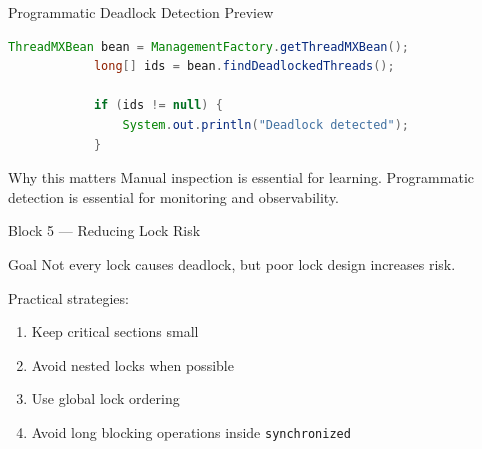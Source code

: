 \documentclass[aspectratio=169,11pt]{beamer}
\begin{document}
	\begin{frame}[fragile]{Programmatic Deadlock Detection Preview}
		\begin{lstlisting}[language=Java]
			ThreadMXBean bean = ManagementFactory.getThreadMXBean();
			long[] ids = bean.findDeadlockedThreads();
			
			if (ids != null) {
				System.out.println("Deadlock detected");
			}
		\end{lstlisting}
		
		\vspace{0.3cm}
		\begin{block}{Why this matters}
			Manual inspection is essential for learning.  
			Programmatic detection is essential for monitoring and observability.
		\end{block}
	\end{frame}
	
	
	\begin{frame}{Block 5 --- Reducing Lock Risk}
		\begin{block}{Goal}
			Not every lock causes deadlock, but poor lock design increases risk.
		\end{block}
		
		\bigskip
		
		Practical strategies:
		\begin{enumerate}
			\item Keep critical sections small
			\item Avoid nested locks when possible
			\item Use global lock ordering
			\item Avoid long blocking operations inside \texttt{synchronized}
		\end{enumerate}
	\end{frame}
	
\end{document}
